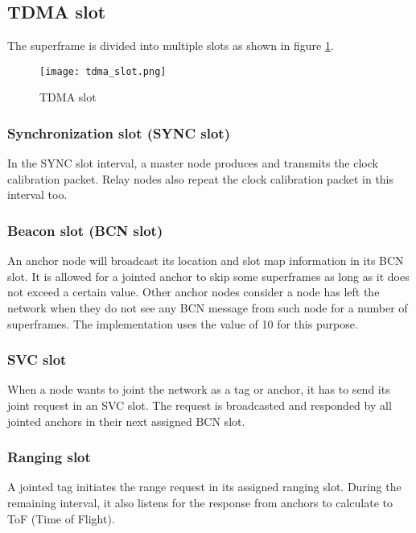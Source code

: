 \documentclass[./main.tex]{subfiles}
\begin{document}
\subsection{TDMA slot}
The superframe is divided into multiple slots as shown in figure \ref{fig:tdma_slot}.
\begin{figure}[ht]
    \begin{center}
        \texttt{[image: tdma\_slot.png]}
    \end{center}
    \caption{TDMA slot}
    \label{fig:tdma_slot}
\end{figure}

\subsubsection{Synchronization slot (SYNC slot)}
In the SYNC slot interval, a master node produces and transmits the clock calibration packet. Relay nodes also repeat the clock calibration packet in this interval too.
\subsubsection{Beacon slot (BCN slot)}
An anchor node will broadcast its location and slot map information in its BCN slot. It is allowed for a jointed anchor to skip some superframes as long as it does not exceed a certain value. Other anchor nodes consider a node has left the network when they do not see any BCN message from such node for a number of superframes. The implementation uses the value of 10 for this purpose.
\subsubsection{SVC slot}
When a node wants to joint the network as a tag or anchor, it has to send its joint request in an SVC slot. The request is broadcasted and responded by all jointed anchors in their next assigned BCN slot.
\subsubsection{Ranging slot}
A jointed tag initiates the range request in its assigned ranging slot. During the remaining interval, it also listens for the response from anchors to calculate to ToF (Time of Flight).
\end{document}
